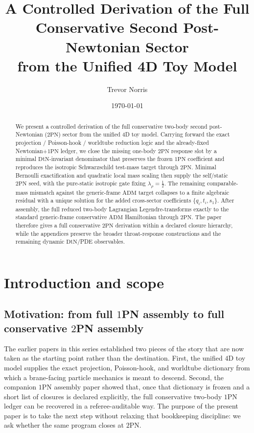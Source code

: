 \documentclass[11pt]{article}
\title{A Controlled Derivation of the Full Conservative Second Post-Newtonian Sector\\
from the Unified 4D Toy Model}
\author{Trevor Norris}
\date{\today}
\newcommand{\OnePN}{\mathrm{1PN}}
\newcommand{\TwoPN}{\mathrm{2PN}}
\newcommand{\ADM}{\mathrm{ADM}}
\newcommand{\DtN}{\mathrm{DtN}}
\begin{document}
\maketitle

\begin{abstract}
We present a controlled derivation of the full conservative two-body second
post-Newtonian (\(\TwoPN\)) sector from the unified \(4\)D toy model.  Carrying
forward the exact projection / Poisson-hook / worldtube reduction logic and the
already-fixed Newtonian+\(\OnePN\) ledger, we close the missing one-body
\(\TwoPN\) response slot by a minimal \(\DtN\)-invariant denominator that
preserves the frozen \(\OnePN\) coefficient and reproduces the isotropic
Schwarzschild test-mass target through \(\TwoPN\).  Minimal Bernoulli
exactification and quadratic local mass scaling then supply the self/static
\(\TwoPN\) seed, with the pure-static isotropic gate fixing
\(\lambda_\rho=\tfrac12\).  The remaining comparable-mass mismatch against the
generic-frame \(\ADM\) target collapses to a finite algebraic residual with a
unique solution for the added cross-sector coefficients \(\{q_i,t_i,s_1\}\).
After assembly, the full reduced two-body Lagrangian Legendre-transforms
exactly to the standard generic-frame conservative \(\ADM\) Hamiltonian through
\(\TwoPN\).  The paper therefore gives a full conservative \(\TwoPN\)
derivation within a declared closure hierarchy, while the appendices preserve
the broader throat-response constructions and the remaining dynamic
\(\DtN\)/PDE observables.
\end{abstract}

\section{Introduction and scope}
\label{sec:intro}

\subsection{Motivation: from full \texorpdfstring{$1$}{1}PN assembly to full conservative \texorpdfstring{$2$}{2}PN assembly}
\label{sec:intro-motivation}

The earlier papers in this series established two pieces of the story that are now taken as the starting point rather than the destination.
First, the unified $4$D toy model supplies the exact projection, Poisson-hook, and worldtube dictionary from which a brane-facing particle mechanics is meant to descend.
Second, the companion $1$PN assembly paper showed that, once that dictionary is frozen and a short list of closures is declared explicitly, the full conservative two-body $1$PN ledger can be recovered in a referee-auditable way.
The purpose of the present paper is to take the next step without relaxing that bookkeeping discipline:
we ask whether the same program closes at $2$PN.
\end{document}
